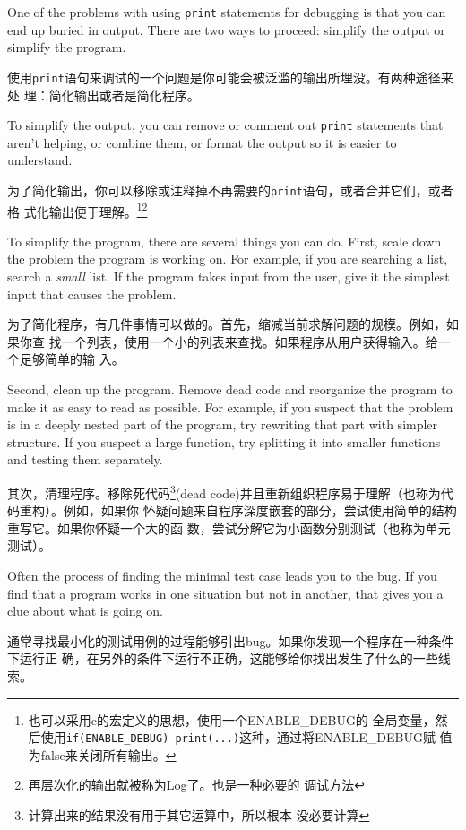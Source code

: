 \documentclass[10pt]{book}
\begin{document}
\begin{CJK}{UTF8}{gbsn}
One of the problems with using {\tt print} statements for debugging
is that you can end up buried in output.  There are two ways
to proceed: simplify the output or simplify the program.

使用{\tt print}语句来调试的一个问题是你可能会被泛滥的输出所埋没。有两种途径来处
理：简化输出或者是简化程序。

To simplify the output, you can remove or comment out {\tt print}
statements that aren't helping, or combine them, or format
the output so it is easier to understand.

为了简化输出，你可以移除或注释掉不再需要的{\tt print}语句，或者合并它们，或者格
式化输出便于理解。\footnote{也可以采用c的宏定义的思想，使用一个ENABLE\_DEBUG的
全局变量，然后使用{\tt if(ENABLE\_DEBUG) print(...)}这种，通过将ENABLE\_DEBUG赋
值为false来关闭所有输出。}\footnote{再层次化的输出就被称为Log了。也是一种必要的
调试方法}

To simplify the program, there are several things you can do.  First,
scale down the problem the program is working on.  For example, if you
are searching a list, search a {\em small} list.  If the program takes
input from the user, give it the simplest input that causes the
problem.

为了简化程序，有几件事情可以做的。首先，缩减当前求解问题的规模。例如，如果你查
找一个列表，使用一个小的列表来查找。如果程序从用户获得输入。给一个足够简单的输
入。

Second, clean up the program.  Remove dead code and reorganize the
program to make it as easy to read as possible.  For example, if you
suspect that the problem is in a deeply nested part of the program,
try rewriting that part with simpler structure.  If you suspect a
large function, try splitting it into smaller functions and testing them
separately.

其次，清理程序。移除死代码\footnote{计算出来的结果没有用于其它运算中，所以根本
没必要计算}(dead code)并且重新组织程序易于理解（也称为代码重构）。例如，如果你
怀疑问题来自程序深度嵌套的部分，尝试使用简单的结构重写它。如果你怀疑一个大的函
数，尝试分解它为小函数分别测试（也称为单元测试）。

Often the process of finding the minimal test case leads you to the
bug.  If you find that a program works in one situation but not in
another, that gives you a clue about what is going on.

通常寻找最小化的测试用例的过程能够引出bug。如果你发现一个程序在一种条件下运行正
确，在另外的条件下运行不正确，这能够给你找出发生了什么的一些线索。


\end{CJK}
\end{document}
